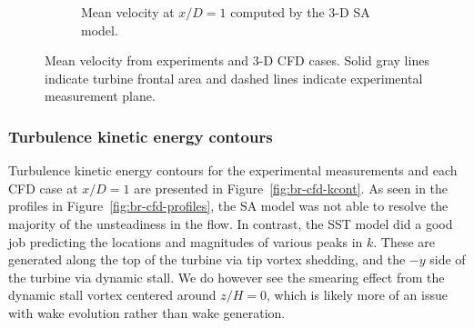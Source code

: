 \documentclass[aip,graphicx]{revtex4-1}
\begin{document}
\begin{figure}
\begin{subfigure}[b]{\textwidth}
        \caption{Mean velocity at $x/D=1$ computed by the 3-D SA model.}

        \label{fig:meancontquiv-SA}
    \end{subfigure}

    \caption{Mean velocity from experiments and 3-D CFD cases. Solid gray lines
        indicate turbine frontal area and dashed lines indicate experimental
        measurement plane.}

    \label{fig:br-cfd-mean-velocity}
\end{figure}


\subsubsection{Turbulence kinetic energy contours}

Turbulence kinetic energy contours for the experimental measurements and each
CFD case at $x/D=1$ are presented in Figure~\ref{fig:br-cfd-kcont}. As seen in
the profiles in Figure~\ref{fig:br-cfd-profiles}, the SA model was not able to
resolve the majority of the unsteadiness in the flow. In contrast, the SST model
did a good job predicting the locations and magnitudes of various peaks in $k$.
These are generated along the top of the turbine via tip vortex shedding, and
the $-y$ side of the turbine via dynamic stall. We do however see the smearing
effect from the dynamic stall vortex centered around $z/H=0$, which is likely
more of an issue with wake evolution rather than wake generation.
\end{document}
